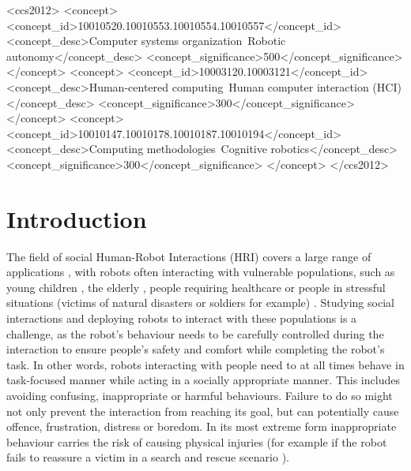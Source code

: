\documentclass[manuscript, review, anonymous]{acmart}
\newcommand{\ES}[1]{\added[id=ES]{#1}}
\begin{document}
\begin{CCSXML}
    <ccs2012>
    <concept>
    <concept_id>10010520.10010553.10010554.10010557</concept_id>
    <concept_desc>Computer systems organization~Robotic autonomy</concept_desc>
    <concept_significance>500</concept_significance>
    </concept>
    <concept>
    <concept_id>10003120.10003121</concept_id>
    <concept_desc>Human-centered computing~Human computer interaction (HCI)</concept_desc>
    <concept_significance>300</concept_significance>
    </concept>
    <concept>
    <concept_id>10010147.10010178.10010187.10010194</concept_id>
    <concept_desc>Computing methodologies~Cognitive robotics</concept_desc>
    <concept_significance>300</concept_significance>
    </concept>
    </ccs2012>
\end{CCSXML}



%
%


\maketitle


\section{Introduction}

The field of social Human-Robot Interactions (HRI) covers a large range of
applications \cite{goodrich2007human}, with robots often interacting with
vulnerable populations, such as young children \cite{belpaeme2018social}, the
elderly \cite{wada2005psychological}, people requiring healthcare
\cite{dautenhahn1999robots} or people in stressful situations (victims of
natural disasters or soldiers for example) \cite{murphy2004human}. Studying social
interactions and deploying robots to interact with these populations is a
challenge, as the robot's behaviour needs to be carefully controlled during the interaction to ensure people's safety and comfort while completing the robot's task. In other
words, robots interacting with people need to at all times behave in task-focused manner while acting in a socially appropriate manner. This includes avoiding confusing, inappropriate or harmful behaviours. Failure to do so might not only prevent the interaction from reaching its
goal, but can potentially cause offence, frustration, distress or boredom. In its most extreme form inappropriate behaviour carries the risk of causing physical injuries (for example if the robot fails to reassure a victim in a search and rescue scenario \cite{harbers2017exploring}). 
\end{document}
